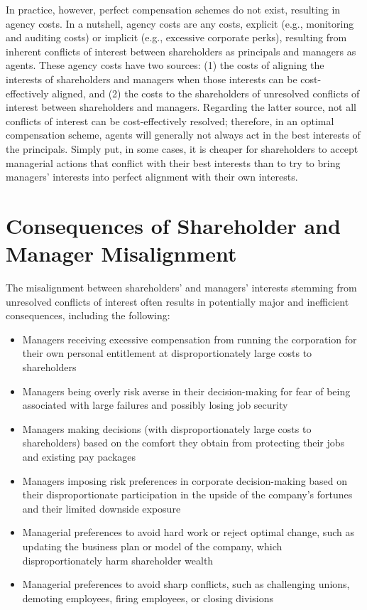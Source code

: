 \documentclass[11pt]{article}
\begin{document}
In practice, however, perfect compensation schemes do not exist, resulting in agency costs. In a nutshell, agency costs are any costs, explicit (e.g., monitoring and auditing costs) or implicit (e.g., excessive corporate perks), resulting from inherent conflicts of interest between shareholders as principals and managers as agents. These agency costs have two sources: (1) the costs of aligning the interests of shareholders and managers when those interests can be cost-effectively aligned, and (2) the costs to the shareholders of unresolved conflicts of interest between shareholders and managers. Regarding the latter source, not all conflicts of interest can be cost-effectively resolved; therefore, in an optimal compensation scheme, agents will generally not always act in the best interests of the principals. Simply put, in some cases, it is cheaper for shareholders to accept managerial actions that conflict with their best interests than to try to bring managers' interests into perfect alignment with their own interests.

\section*{Consequences of Shareholder and Manager Misalignment}
The misalignment between shareholders' and managers' interests stemming from unresolved conflicts of interest often results in potentially major and inefficient consequences, including the following:

\begin{itemize}
  \item Managers receiving excessive compensation from running the corporation for their own personal entitlement at disproportionately large costs to shareholders
  \item Managers being overly risk averse in their decision-making for fear of being associated with large failures and possibly losing job security
  \item Managers making decisions (with disproportionately large costs to shareholders) based on the comfort they obtain from protecting their jobs and existing pay packages
  \item Managers imposing risk preferences in corporate decision-making based on their disproportionate participation in the upside of the company's fortunes and their limited downside exposure
  \item Managerial preferences to avoid hard work or reject optimal change, such as updating the business plan or model of the company, which disproportionately harm shareholder wealth
  \item Managerial preferences to avoid sharp conflicts, such as challenging unions, demoting employees, firing employees, or closing divisions
\end{itemize}
\end{document}

